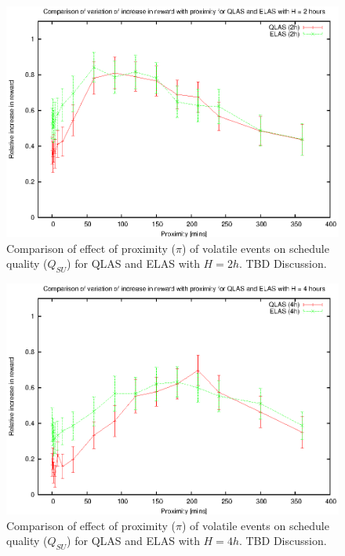 \begin{figure}[htbp]
\begin{center}
    \includegraphics[scale=1.0, angle=0]{figures/evplot_2.eps}
\end{center}
\caption[Comparison of effect of proximity ($\pi$) of volatile events on schedule quality ($Q_{SU}$) for QLAS and ELAS ($H = 2h$).]
{Comparison of effect of proximity ($\pi$) of volatile events on schedule quality ($Q_{SU}$) for QLAS and ELAS with $H = 2h$. TBD Discussion.}
\label{fig:vol_qe05_pi}
\end{figure}

\begin{figure}[htbp]
\begin{center}
    \includegraphics[scale=1.0, angle=0]{figures/evplot_4.eps}
\end{center}
\caption[Comparison of effect of proximity ($\pi$) of volatile events on schedule quality ($Q_{SU}$) for QLAS and ELAS ($H = 4h$).]
{Comparison of effect of proximity ($\pi$) of volatile events on schedule quality ($Q_{SU}$) for QLAS and ELAS with $H = 4h$. TBD Discussion.}
\label{fig:vol_qe05_pi}
\end{figure}
